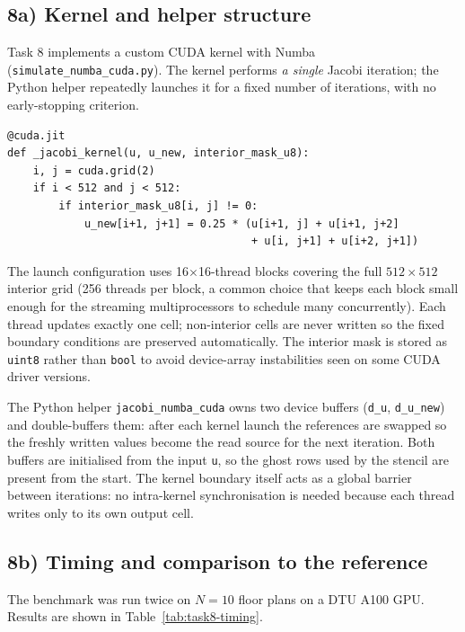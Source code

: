 \documentclass[11pt,a4paper]{article}
\begin{document}
\subsection*{8a) Kernel and helper structure}

Task 8 implements a custom CUDA kernel with Numba
(\texttt{simulate\_numba\_cuda.py}). The kernel performs \emph{a single} Jacobi
iteration; the Python helper repeatedly launches it for a fixed number of
iterations, with no early-stopping criterion.

\begin{lstlisting}
@cuda.jit
def _jacobi_kernel(u, u_new, interior_mask_u8):
    i, j = cuda.grid(2)
    if i < 512 and j < 512:
        if interior_mask_u8[i, j] != 0:
            u_new[i+1, j+1] = 0.25 * (u[i+1, j] + u[i+1, j+2]
                                      + u[i, j+1] + u[i+2, j+1])
\end{lstlisting}

The launch configuration uses 16$\times$16-thread blocks covering the full
\(512 \times 512\) interior grid (256 threads per block, a common choice that
keeps each block small enough for the streaming multiprocessors to schedule
many concurrently). Each thread updates exactly one cell; non-interior cells
are never written so the fixed boundary conditions are preserved automatically. The interior mask is
stored as \texttt{uint8} rather than \texttt{bool} to avoid device-array
instabilities seen on some CUDA driver versions.

The Python helper \texttt{jacobi\_numba\_cuda} owns two device buffers
(\texttt{d\_u}, \texttt{d\_u\_new}) and double-buffers them: after each kernel
launch the references are swapped so the freshly written values become the read
source for the next iteration. Both buffers are initialised from the input
\texttt{u}, so the ghost rows used by the stencil are present from the start.
The kernel boundary itself acts as a global barrier between iterations: no
intra-kernel synchronisation is needed because each thread writes only to its
own output cell.

\subsection*{8b) Timing and comparison to the reference}

The benchmark was run twice on \(N = 10\) floor plans on a DTU A100 GPU.
Results are shown in Table~\ref{tab:task8-timing}.
\end{document}
